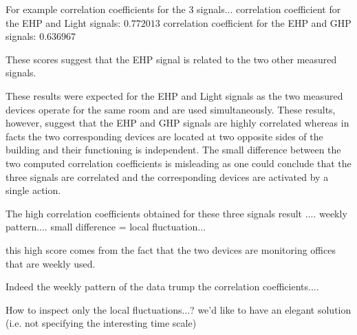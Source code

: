 For example correlation coefficients for the 3 signals...
correlation coefficient for the EHP and Light signals: $0.772013$
correlation coefficient for the EHP and GHP signals: $0.636967$

These scores suggest that the EHP signal is related to the two other measured signals.

These results were expected for the EHP and Light signals as the two measured devices operate for the same room and are used simultaneously.
These results, however, suggest that the EHP and GHP signals are highly correlated whereas in facts the two corresponding devices are located at two opposite sides of the building and their functioning is independent.
The small difference between the two computed correlation coefficients is misleading as one could conclude that the three signals are correlated and the corresponding devices are activated by a single action.

The high correlation coefficients obtained for these three signals result .... weekly pattern....
small difference = local fluctuation...

this high score comes from the fact that the two devices are monitoring offices that are weekly used.

Indeed the weekly pattern of the data trump the correlation coefficients....

How to inspect only the local fluctuations...?
we'd like to have an elegant solution (i.e. not specifying the interesting time scale)


\newpage
